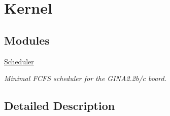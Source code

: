 \hypertarget{group__kernel}{}\section{Kernel}
\label{group__kernel}
\subsection*{Modules}
\begin{DoxyCompactItemize}
\item 
\hyperlink{group___scheduler}{Scheduler}
\begin{DoxyCompactList}\small\item\em Minimal F\+C\+FS scheduler for the G\+I\+N\+A2.\+2b/c board. \end{DoxyCompactList}\end{DoxyCompactItemize}


\subsection{Detailed Description}

